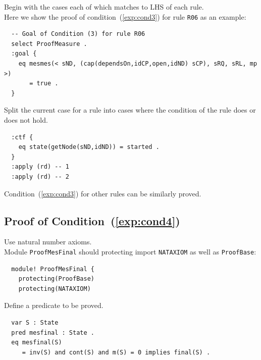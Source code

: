 \documentclass[12pt]{report}
\begin{document}
 Begin with the cases each of which matches to
LHS of each rule. \\ 
Here we show the proof of condition~(\ref{exp:cond3}) for rule {\tt R06}
as an example:
\small
\begin{verbatim}
  -- Goal of Condition (3) for rule R06
  select ProofMeasure .
  :goal {
    eq mesmes(< sND, (cap(dependsOn,idCP,open,idND) sCP), sRQ, sRL, mp >)
       = true .
  }
\end{verbatim}
\normalsize

 Split the current case for a rule into
cases where the condition of the rule does or does not hold. 
\small
\begin{verbatim}
  :ctf {
    eq state(getNode(sND,idND)) = started .
  }
  :apply (rd) -- 1
  :apply (rd) -- 2
\end{verbatim}
\normalsize
Condition~(\ref{exp:cond3}) for other rules can be similarly proved.

\subsection{Proof of Condition~(\ref{exp:cond4})}
\label{sec:TOSCAmesfinal}
 Use natural number axioms. \\
Module {\tt ProofMesFinal} should protecting import {\tt NATAXIOM} as
well as {\tt ProofBase}:
\small
\begin{verbatim}
  module! ProofMesFinal {
    protecting(ProofBase)
    protecting(NATAXIOM)
\end{verbatim}
\normalsize

 Define a predicate to be proved.
\small
\begin{verbatim}
  var S : State
  pred mesfinal : State .
  eq mesfinal(S)
     = inv(S) and cont(S) and m(S) = 0 implies final(S) .
\end{verbatim}
\normalsize
\end{document}
